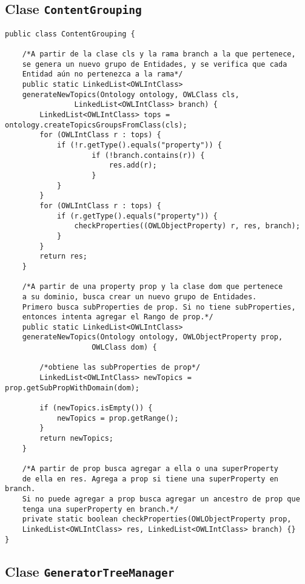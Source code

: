 \subsection{Clase \texttt{ContentGrouping}}
\label{sec:clase_content_grouping}

\begin{verbatim}
public class ContentGrouping {

    /*A partir de la clase cls y la rama branch a la que pertenece,
    se genera un nuevo grupo de Entidades, y se verifica que cada
    Entidad aún no pertenezca a la rama*/
    public static LinkedList<OWLIntClass>
    generateNewTopics(Ontology ontology, OWLClass cls, 
                LinkedList<OWLIntClass> branch) {
        LinkedList<OWLIntClass> tops = ontology.createTopicsGroupsFromClass(cls);
        for (OWLIntClass r : tops) {
            if (!r.getType().equals("property")) {
                    if (!branch.contains(r)) {
                        res.add(r);
                    }
            }
        }
        for (OWLIntClass r : tops) {
            if (r.getType().equals("property")) {
                checkProperties((OWLObjectProperty) r, res, branch);
            }
        }
        return res;
    }

    /*A partir de una property prop y la clase dom que pertenece
    a su dominio, busca crear un nuevo grupo de Entidades.
    Primero busca subProperties de prop. Si no tiene subProperties, 
    entonces intenta agregar el Rango de prop.*/
    public static LinkedList<OWLIntClass> 
    generateNewTopics(Ontology ontology, OWLObjectProperty prop,
                    OWLClass dom) {
        
        /*obtiene las subProperties de prop*/
        LinkedList<OWLIntClass> newTopics = prop.getSubPropWithDomain(dom);
        
        if (newTopics.isEmpty()) {
            newTopics = prop.getRange();
        }
        return newTopics;
    }
    
    /*A partir de prop busca agregar a ella o una superProperty
    de ella en res. Agrega a prop si tiene una superProperty en branch.
    Si no puede agregar a prop busca agregar un ancestro de prop que 
    tenga una superProperty en branch.*/
    private static boolean checkProperties(OWLObjectProperty prop,
    LinkedList<OWLIntClass> res, LinkedList<OWLIntClass> branch) {}
}
\end{verbatim}

\subsection{Clase \texttt{GeneratorTreeManager}}
\label{sec:clase_generator_tree}

